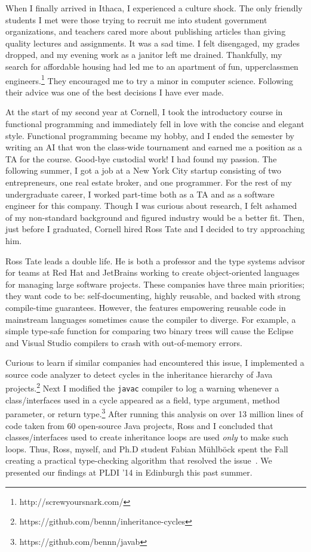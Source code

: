 \documentclass[12pt]{article}
\newcommand{\hdr}[2]{\vspace{-0.4cm}{\flushleft{\hrulefill\\\textbf{#1}\hfill{#2}\\\vspace{-0.2cm}\hrulefill}}\vspace{0.1cm}}
\begin{document}
When I finally arrived in Ithaca, I experienced a culture shock.
The only friendly students I met were those trying to recruit me into student government organizations, and teachers cared more about publishing articles than giving quality lectures and assignments.
It was a sad time.
I felt disengaged, my grades dropped, and my evening work as a janitor left me drained.
Thankfully, my search for affordable housing had led me to an apartment of fun, upperclassmen engineers.\footnote{http://screwyoursnark.com/}
They encouraged me to try a minor in computer science.
Following their advice was one of the best decisions I have ever made.

At the start of my second year at Cornell, I took the introductory course in functional programming and immediately fell in love with the concise and elegant style.
Functional programming became my hobby, and I ended the semester by writing an AI that won the class-wide tournament and earned me a position as a TA for the course.
Good-bye custodial work!
I had found my passion.
The following summer, I got a job at a New York City startup consisting of two entrepreneurs, one real estate broker, and one programmer.
For the rest of my undergraduate career, I worked part-time both as a TA and as a software engineer for this company.
Though I was curious about research, I felt ashamed of my non-standard background and figured industry would be a better fit.
Then, just before I graduated, Cornell hired Ross Tate and I decided to try approaching him.

\hdr{Decidable Subtyping for Object-Oriented Langauges}{Summer~\textendash~Fall 2013}

Ross Tate leads a double life.
He is both a professor and the type systems advisor for teams at Red Hat and JetBrains working to create object-oriented languages for managing large software projects.
These companies have three main priorities; they want code to be: self-documenting, highly reusable, and backed with strong compile-time guarantees.
However, the features empowering reusable code in mainstream languages sometimes cause the compiler to diverge.
For example, a simple type-safe function for comparing two binary trees will cause the Eclipse and Visual Studio compilers to crash with out-of-memory errors.

Curious to learn if similar companies had encountered this issue, I implemented a source code analyzer to detect cycles in the inheritance hierarchy of Java projects.\footnote{https://github.com/bennn/inheritance-cycles}
Next I modified the \texttt{javac} compiler to log a warning whenever a class/interfaces used in a cycle appeared as a field, type argument, method parameter, or return type.\footnote{https://github.com/bennn/javab}
After running this analysis on over 13 million lines of code taken from 60 open-source Java projects, Ross and I concluded that classes/interfaces used to create inheritance loops are used \emph{only} to make such loops.
Thus, Ross, myself, and Ph.D student Fabian M\"uhlb\"ock spent the Fall creating a practical type-checking algorithm that resolved the issue~\cite{shapes}.
We presented our findings at PLDI '14 in Edinburgh this past summer.
\end{document}
